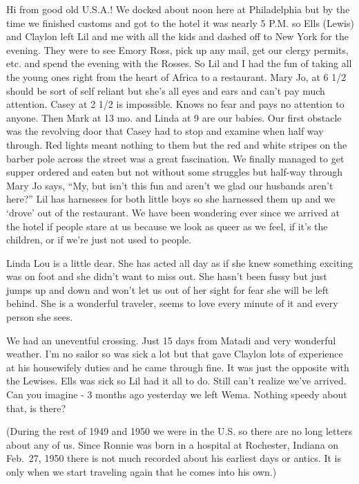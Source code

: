 \documentclass[
]{book}
\begin{document}
Hi from good old U.S.A.! We docked about noon here at Philadelphia but by the time we finished customs and got to the hotel it was nearly 5 P.M. so Ells (Lewis) and Claylon left Lil and me with all the kids and dashed off to New York for the evening. They were to see Emory Ross, pick up any mail, get our clergy permits, etc. and spend the evening with the Rosses. So Lil and I had the fun of taking all the young ones right from the heart of Africa to a restaurant. Mary Jo, at 6 1/2 should be sort of self reliant but she's all eyes and ears and can't pay much attention. Casey at 2 1/2 is impossible. Knows no fear and pays no attention to anyone. Then Mark at 13 mo. and Linda at 9 are our babies. Our first obstacle was the revolving door that Casey had to stop and examine when half way through. Red lights meant nothing to them but the red and white stripes on the barber pole across the street was a great fascination. We finally managed to get supper ordered and eaten but not without some struggles but half-way through Mary Jo says, ``My, but isn't this fun and aren't we glad our husbands aren't here?'' Lil has harnesses for both little boys so she harnessed them up and we `drove' out of the restaurant. We have been wondering ever since we arrived at the hotel if people stare at us because we look as queer as we feel, if it's the children, or if we're just not used to people.

Linda Lou is a little dear. She has acted all day as if she knew something exciting was on foot and she didn't want to miss out. She hasn't been fussy but just jumps up and down and won't let us out of her sight for fear she will be left behind. She is a wonderful traveler, seems to love every minute of it and every person she sees.

We had an uneventful crossing. Just 15 days from Matadi and very wonderful weather. I'm no sailor so was sick a lot but that gave Claylon lots of experience at his housewifely duties and he came through fine. It was just the opposite with the Lewises. Ells was sick so Lil had it all to do. Still can't realize we've arrived. Can you imagine - 3 months ago yesterday we left Wema. Nothing speedy about that, is there?

(During the rest of 1949 and 1950 we were in the U.S. so there are no long letters about any of us. Since Ronnie was born in a hospital at Rochester, Indiana on Feb.~27, 1950 there is not much recorded about his earliest days or antics. It is only when we start traveling again that he comes into his own.)
\end{document}
